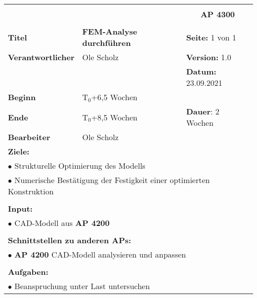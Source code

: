 \clearpage
\begin{table}[!h]
	\begin{center}
		\begin{tabular}{|p{35mm}||p{55mm}|p{50mm}||p{40mm}|}
			\hline
			\multicolumn{3}{|l||}{\textbf{}} & \multicolumn{1}{c|}{}\\
			\multicolumn{3}{|l||}{\textbf{}} & \multicolumn{1}{c|}{\textbf{AP 4300}}\\
			\multicolumn{3}{|l||}{\textbf{}} & \multicolumn{1}{c|}{}\\
			\hline\hline
			\textbf{Titel} & \multicolumn{2}{p{7cm}||}{\textbf{FEM-Analyse durchführen}} 
			& \textbf{Seite:} 1 von 1\\
			\hline
			\textbf{Verantwortlicher} & \multicolumn{2}{l||}{Ole Scholz} & \textbf{Version:} 1.0\\
			\hline
			\multicolumn{3}{|l||}{} & \textbf{Datum:} 23.09.2021\\
			\hline\hline
			\textbf{Beginn} & \multicolumn{2}{l||}{T$_0$+6,5 Wochen} & \\
			\hline
			\textbf{Ende} & \multicolumn{2}{l||}{T$_0$+8,5 Wochen} & \textbf{Dauer}: 2 Wochen\\
			\hline\hline
			\textbf{Bearbeiter} & \multicolumn{3}{l|}{Ole Scholz}\\
			\hline\hline
			\multicolumn{4}{|p{150mm}|}{\textbf{Ziele:}}\\
			\multicolumn{4}{|p{150mm}|}{$\bullet$ Strukturelle Optimierung des Modells}\\
			\multicolumn{4}{|p{150mm}|}{$\bullet$ Numerische Bestätigung der Festigkeit einer optimierten Konstruktion}\\
			\multicolumn{4}{|p{150mm}|}{}\\
			\multicolumn{4}{|p{150mm}|}{\textbf{Input:}}\\
			\multicolumn{4}{|p{150mm}|}{$\bullet$ CAD-Modell aus \textbf{AP 4200}}\\
			\multicolumn{4}{|p{150mm}|}{}\\
			\multicolumn{4}{|p{150mm}|}{\textbf{Schnittstellen zu anderen APs:}}\\
			\multicolumn{4}{|p{150mm}|}{$\bullet$ \textbf{AP 4200} CAD-Modell analysieren und anpassen}\\
			\multicolumn{4}{|p{150mm}|}{}\\
			\multicolumn{4}{|p{150mm}|}{\textbf{Aufgaben:}}\\
			\multicolumn{4}{|p{150mm}|}{$\bullet$ Beanspruchung unter Last untersuchen}\\

\end{tabular}
\end{center}
\end{table}
